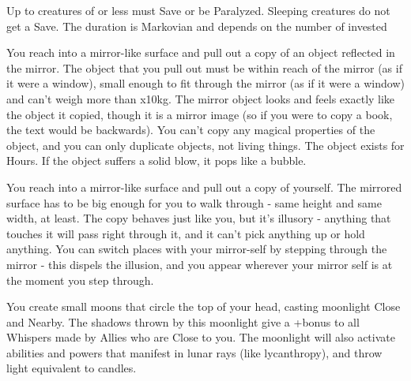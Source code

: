{\MYSTERY [
  Name = Paralysis,
  Link = arcana-mystery-paralysis,
  Paradigm = Mind,
  Save = Y (neg.),
  Duration = Markovian,
  Target = Close or Nearby Target(s)
]

Up to \DICE creatures of \DICE \HD or less must Save or be Paralyzed.  Sleeping creatures do not get a Save. The duration is Markovian and depends on the number of \DICE invested

\MYSTERY [
  Name = Strange Copy,
  Link = arcana-mystery-strange-copy,
  Paradigm = Mind,
  Save = N,
  Duration = \SUM Hours,
  Target = Close Target(s)
]

You reach into a mirror-like surface and pull out a copy of an object reflected in the mirror. The object that you pull out must be within reach of the mirror (as if it were a window), small enough to fit through the mirror (as if it were a window) and can't weigh more than \DICE x10kg. The mirror object looks and feels exactly like the object it copied, though it is a mirror image (so if you were to copy a book, the text would be backwards).  You can't copy any magical properties of the object, and you can only duplicate objects, not living things.  The object exists for \SUMDICE Hours.  If the object suffers a solid blow, it pops like a bubble.

\MYSTERY [
  Name = Twin,
  Link = arcana-mystery-twin,
  Paradigm = Mind,
  Save = N,
  Duration = \SUM Minutes,
  Target = Close Target(s)
]

You reach into a mirror-like surface and pull out a copy of yourself.  The mirrored surface has to be big enough for you to walk through - same height and same width, at least.  The copy behaves just like you, but it's illusory - anything that touches it will pass right through it, and it can't pick anything up or hold anything.  You can switch places with your mirror-self by stepping through the mirror - this dispels the illusion, and you appear wherever your mirror self is at the moment you step through.

\newpage

\MYSTERY [
  Name = Children of Shul,
  Link = arcana-mystery-children-of-shul,
  Paradigm = Prophesy,
  Save = Y (half),
  Duration = Session,
  Target = Self
]

You create \DICE small moons that circle the top of your head, casting moonlight Close and Nearby.  The shadows thrown by this moonlight give a +\DICE bonus to all Whispers made by Allies who are Close to you.  The moonlight will also activate abilities and powers that manifest in lunar rays (like lycanthropy), and throw light equivalent to \DICE candles.

}
